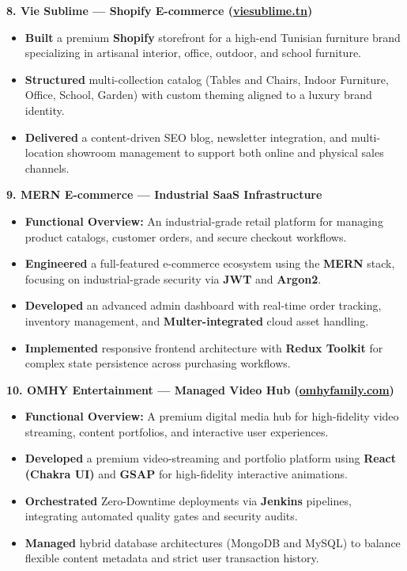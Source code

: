 \documentclass[10pt, letterpaper]{article}
\newenvironment{highlights}{
\begin{itemize}[leftmargin=12pt, itemsep=2pt]
}{
\end{itemize}
}
\begin{document}
\textbf{8. Vie Sublime --- Shopify E-commerce (\href{https://viesublime.tn}{viesublime.tn})}
\begin{highlights}
\item \textbf{Built} a premium \textbf{Shopify} storefront for a high-end Tunisian furniture brand specializing in artisanal interior, office, outdoor, and school furniture.
\item \textbf{Structured} multi-collection catalog (Tables and Chairs, Indoor Furniture, Office, School, Garden) with custom theming aligned to a luxury brand identity.
\item \textbf{Delivered} a content-driven SEO blog, newsletter integration, and multi-location showroom management to support both online and physical sales channels.
\end{highlights}

\textbf{9. MERN E-commerce --- Industrial SaaS Infrastructure}
\begin{highlights}
\item \textbf{Functional Overview:} An industrial-grade retail platform for managing product catalogs, customer orders, and secure checkout workflows.
\item \textbf{Engineered} a full-featured e-commerce ecosystem using the \textbf{MERN} stack, focusing on industrial-grade security via \textbf{JWT} and \textbf{Argon2}.
\item \textbf{Developed} an advanced admin dashboard with real-time order tracking, inventory management, and \textbf{Multer-integrated} cloud asset handling.
\item \textbf{Implemented} responsive frontend architecture with \textbf{Redux Toolkit} for complex state persistence across purchasing workflows.
\end{highlights}

\textbf{10. OMHY Entertainment --- Managed Video Hub (\href{https://www.omhyfamily.com/}{omhyfamily.com})}
\begin{highlights}
\item \textbf{Functional Overview:} A premium digital media hub for high-fidelity video streaming, content portfolios, and interactive user experiences.
\item \textbf{Developed} a premium video-streaming and portfolio platform using \textbf{React (Chakra UI)} and \textbf{GSAP} for high-fidelity interactive animations.
\item \textbf{Orchestrated} Zero-Downtime deployments via \textbf{Jenkins} pipelines, integrating automated quality gates and security audits.
\item \textbf{Managed} hybrid database architectures (MongoDB and MySQL) to balance flexible content metadata and strict user transaction history.
\end{highlights}
\end{document}
